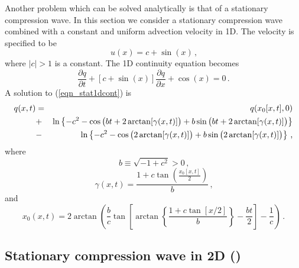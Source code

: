 \documentclass[11pt]{book}
\begin{document}
Another problem which can be solved analytically is that of a stationary compression wave.  In this section we consider a stationary compression wave combined with a constant and uniform advection velocity in 1D.  The velocity is specified to be
\begin{equation}
\label{eqn_statu1d}
u(x) = c + \sin(x) \,\mbox{,}
\end{equation}
where $|c|>1$ is a constant.  The 1D continuity equation becomes
\begin{equation}
\label{eqn_stat1dcont}
\frac{\partial q}{\partial t} + [c + \sin(x)] \frac{\partial q}{\partial x} + \cos(x) = 0 \,\mbox{.}
\end{equation}
A solution to (\ref{eqn_stat1dcont}) is
\begin{eqnarray}
\label{eqn_stat1dsoln}
q(x,t) &=& q(x_0[x,t],0) \nonumber \vspace{0.3cm}\\
&+& \ln\left\{ -c^2 - \cos\big(bt + 2\arctan[\gamma(x,t)] \big) + b\sin\big(bt + 2\arctan[\gamma(x,t)] \big) \right\} \nonumber \vspace{0.3cm}\\
&-& \ln\left\{ -c^2 - \cos\big( 2\arctan[\gamma(x,t)] \big) + b\sin\big( 2\arctan[\gamma(x,t)] \big) \right\} \,\mbox{,}
\end{eqnarray}
where
\begin{equation}
\label{eqn_b}
b \equiv \sqrt{-1 + c^2} > 0 \,\mbox{,}
\end{equation}
\begin{equation}
\label{eqn_gamma}
\gamma(x,t) = \frac{ 1 + c\tan\left( \frac{x_0[x,t]}{2} \right) }{b} \,\mbox{,}
\end{equation}
and
\begin{equation}
\label{eqn_stat1dx0}
x_0(x,t) = 2\arctan\left( \frac{b}{c} \tan \left[ \arctan\left\{ \frac{1+c\tan[x/2]}{b} \right\} - \frac{bt}{2} \right] - \frac{1}{c} \right) \,\mbox{.}
\end{equation}

\subsection{Stationary compression wave in 2D (\texorpdfstring{}{compression\_wave})}
\label{stationary_2d}
\end{document}
